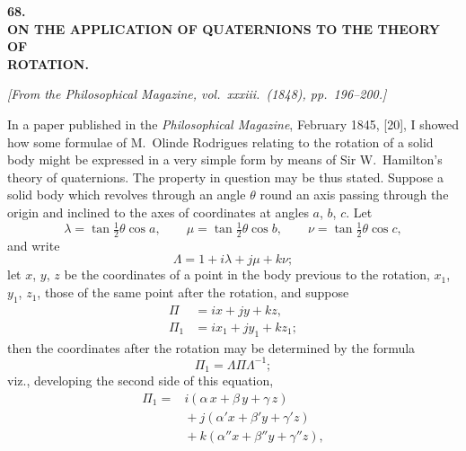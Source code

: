 \documentclass[11pt]{article}
\begin{document}
\vfill\pagebreak

\begin{center}
\textbf{\Large 68.}\\[1em]
\textbf{\large ON THE APPLICATION OF QUATERNIONS TO THE THEORY OF}\\[0.3em]
\textbf{\large ROTATION.}
\end{center}

\medskip

\begin{center}
\textit{[From the Philosophical Magazine, vol.\ xxxiii.\ (1848), pp.\ 196--200.]}
\end{center}

\medskip

In a paper published in the \textit{Philosophical Magazine}, February 1845, [20], I showed
how some formulae of M.\ Olinde Rodrigues relating to the rotation of a solid body
might be expressed in a very simple form by means of Sir W.\ Hamilton's theory of
quaternions. The property in question may be thus stated. Suppose a solid body
which revolves through an angle $\theta$ round an axis passing through the origin and
inclined to the axes of coordinates at angles $a$, $b$, $c$. Let
\[
\lambda = \tan\tfrac{1}{2}\theta\cos a, \qquad
\mu = \tan\tfrac{1}{2}\theta\cos b, \qquad
\nu = \tan\tfrac{1}{2}\theta\cos c,
\]
and write
\[
\Lambda = 1 + i\lambda + j\mu + k\nu;
\]
let $x$, $y$, $z$ be the coordinates of a point in the body previous to the rotation,
$x_{1}$, $y_{1}$, $z_{1}$, those of the same point after the rotation, and suppose
\begin{align*}
\Pi &= ix + jy + kz,\\
\Pi_{1} &= ix_{1} + jy_{1} + kz_{1};
\end{align*}
then the coordinates after the rotation may be determined by the formula
\[
\Pi_{1} = \Lambda\Pi\Lambda^{-1};
\]
viz., developing the second side of this equation,
\begin{align*}
\Pi_{1} = {}&i(\alpha\,x + \beta\,y + \gamma\,z)\\
&{}+ j(\alpha'x + \beta'y + \gamma'z)\\
&{}+ k(\alpha''x + \beta''y + \gamma''z),
\end{align*}

\vfill\pagebreak
\end{document}
